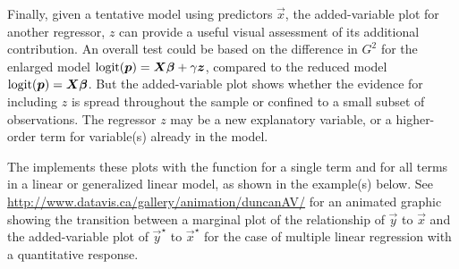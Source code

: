 \documentclass[11pt]{book}\usepackage[]{graphicx}\usepackage[]{color}
\begin{document}
Finally, given a tentative model using predictors $\vec{x}$, the added-variable plot for
another regressor, $z$ can provide a useful visual assessment of its additional contribution.
An overall test could be based on the difference in $G^2$ for
the enlarged model $\logit(\vec{p}) = \mat{X} \vec{\beta} + \gamma \vec{z}$,
compared to the reduced model
$\logit(\vec{p}) = \mat{X} \vec{\beta}$.
But the added-variable plot shows whether the evidence for including
$z$ is spread throughout the sample or confined to a small subset
of observations.
The regressor $z$ may be a new explanatory variable, or a higher-order term for
variable(s) already in the model.

The  implements these plots with the function 
for a single term and  for all terms in a linear or generalized
linear model, as shown in the example(s) below.
See \url{http://www.datavis.ca/gallery/animation/duncanAV/} for an animated graphic
showing the transition between a marginal plot of the relationship of $\vec{y}$ to $\vec{x}$
and the added-variable plot of $\vec{y}^\star$ to $\vec{x}^\star$ for the case of 
multiple linear regression with a quantitative response.
\end{document}

